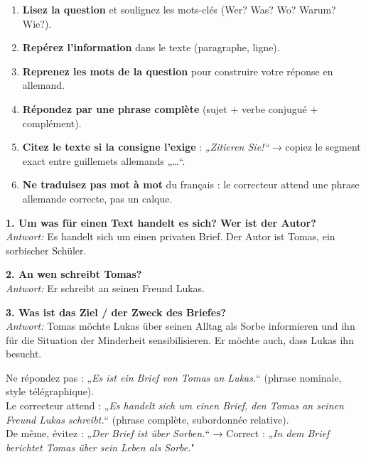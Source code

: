 \documentclass[11pt]{article}
\begin{document}
\begin{methode}
\begin{enumerate}
\item \textbf{Lisez la question} et soulignez les mots-clés (Wer? Was? Wo? Warum? Wie?).
\item \textbf{Repérez l'information} dans le texte (paragraphe, ligne).
\item \textbf{Reprenez les mots de la question} pour construire votre réponse en allemand.
\item \textbf{Répondez par une phrase complète} (sujet + verbe conjugué + complément).
\item \textbf{Citez le texte si la consigne l'exige} : \emph{„Zitieren Sie!“} → copiez le segment exact entre guillemets allemands „…“.
\item \textbf{Ne traduisez pas mot à mot} du français : le correcteur attend une phrase allemande correcte, pas un calque.
\end{enumerate}
\end{methode}

\begin{exemplebox}
\textbf{1. Um was für einen Text handelt es sich? Wer ist der Autor?} \\
\emph{Antwort:} Es handelt sich um einen privaten Brief. Der Autor ist Tomas, ein sorbischer Schüler.

\textbf{2. An wen schreibt Tomas?} \\
\emph{Antwort:} Er schreibt an seinen Freund Lukas.

\textbf{3. Was ist das Ziel / der Zweck des Briefes?} \\
\emph{Antwort:} Tomas möchte Lukas über seinen Alltag als Sorbe informieren und ihn für die Situation der Minderheit sensibilisieren. Er möchte auch, dass Lukas ihn besucht.
\end{exemplebox}

\begin{attention}
Ne répondez pas : „\emph{Es ist ein Brief von Tomas an Lukas.}“ (phrase nominale, style télégraphique). \\
Le correcteur attend : „\emph{Es handelt sich um einen Brief, den Tomas an seinen Freund Lukas schreibt.}“ (phrase complète, subordonnée relative). \\
De même, évitez : „\emph{Der Brief ist über Sorben.}“ → Correct : „\emph{In dem Brief berichtet Tomas über sein Leben als Sorbe.}"
\end{attention}
\end{document}
